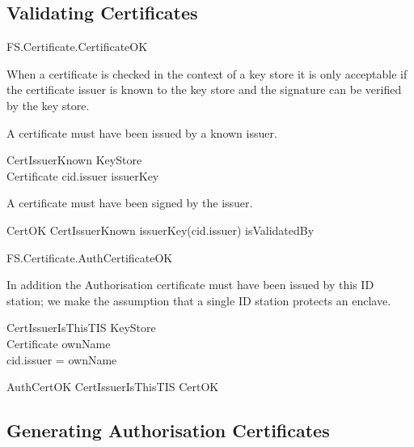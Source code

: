 \subsection{Validating Certificates}

\begin{traceunit}{FS.Certificate.CertificateOK}
\end{traceunit}

When a certificate is checked in the context of a key store it is
only acceptable if the certificate issuer is known to the key store
and the signature can be verified by the key store.

A certificate must have been issued by a known issuer.

\begin{schema}{CertIssuerKnown}
        KeyStore
\\      Certificate
\where
        cid.issuer \in \dom issuerKey
\end{schema}

A certificate must have been signed by the issuer. 

\begin{schema}{CertOK}
        CertIssuerKnown
\where
        issuerKey(cid.issuer) \in isValidatedBy
\end{schema}


\begin{traceunit}{FS.Certificate.AuthCertificateOK}
\end{traceunit}


In addition the Authorisation certificate must have been issued by this ID
station; we make the assumption that a single ID station protects an enclave.

\begin{schema}{CertIssuerIsThisTIS}
        KeyStore
\\      Certificate
\where
        ownName \neq \Nil
\\      cid.issuer = \The ownName
\end{schema}

\begin{zed}
        AuthCertOK  CertIssuerIsThisTIS \land CertOK
\end{zed}

\subsection{Generating Authorisation Certificates}

